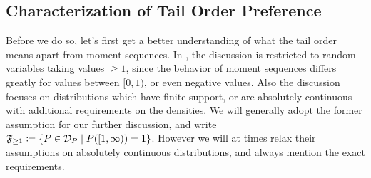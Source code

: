 \documentclass[a4paper]{scrreprt}
\begin{document}
    \subsection{Characterization of Tail Order Preference}
    \newcommand{\Fgeq}{\mathfrak{F}_{\geq 1}} %
    Before we do so, let's first get a better understanding of what the tail order means apart from moment sequences.
    In \cite{bib:rassGameRiskManagI}, the discussion is restricted to random variables taking values $\geq 1$, since the behavior of moment sequences differs greatly for values between $[0, 1)$, or even negative values. Also the discussion focuses on distributions which have finite support, or are absolutely continuous with additional requirements on the densities. We will generally adopt the former assumption for our further discussion, and write $\Fgeq \coloneqq \set{P \in \DP \mid P([1, \infty)) = 1}$.
    However we will at times relax their assumptions on absolutely continuous distributions, and always mention the exact requirements.
    
\end{document}
